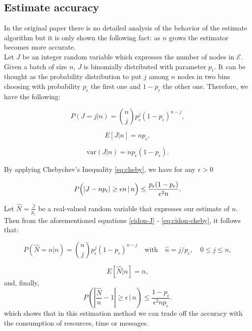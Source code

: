 \documentclass[11pt,a4paper,twoside,openright]{book}
\newcommand{\pc}{p_{\epsilon}}
\begin{document}
\subsection{Estimate accuracy}
\label{cidon-estimate-accuracy}

In the original paper \cite{cidon} there is no detailed analysis of the behavior of the estimate algorithm but it is only shown the following fact: as $n$ grows the estimator becomes more accurate.\\
    
Let $J$ be an integer random variable which expresses the number of nodes in $\mathcal{E}$. Given a batch of size $n$, $J$ is binomially distributed with parameter $\pc$. It can be thought as the probability distribution to put $j$ among  $n$ nodes in two bins choosing with probability $\pc$ the first one and $1-\pc$ the other one.  Therefore, we have the following:

\begin{equation}
	P(J=j|n)={n \choose j}\pc^{j}(1-\pc)^{n-j},
           \label{cidon-J}
\end{equation}

\begin{equation}
E[J|n]=n\pc ,
\label{cidon-e-estimate}
\end{equation}

\begin{equation}
\textrm{var}(J|n)=n\pc(1-\pc).
\end{equation}


By applying Chebychev's Inequality \eqref{eq:cheby},  we have for any $\epsilon>0$
 
 \begin{equation}
P\Bigl( \left| J-n\pc\right| \geq \epsilon n \,|\, n \Bigr) \leq \frac{\pc(1-\pc)}{\epsilon^{2}n}.
\label{eq:cidon-cheby}
 \end{equation}
 
 Let $\hat{N}={\displaystyle \frac{\hat{J}}{\pc}}$ be a real-valued random variable that expresses our estimate of $n$. Then from the aforementioned equations \eqref{cidon-J} - \eqref{eq:cidon-cheby}, it follows that:

\begin{equation}
P\left(\hat{N}=n|n\right)={n \choose j}\pc^{j}(1-\pc)^{n-j} \quad \textrm{with} \quad \hat{n}=j/\pc, \quad 0\leq j\leq n,
\end{equation}

\begin{equation}
E[\hat{N}|n]=n,
\end{equation}
and, finally,
 \begin{equation}
P\left( \left| \frac{\hat{N}}{n}-1\right| \geq \epsilon  \,\big|\, n \right) \leq \frac{1-\pc}{\epsilon^{2}n\pc}.
 \end{equation}
which shows that in this estimation method we can trade off the accuracy with the consumption of resources, time or messages.
\end{document}
